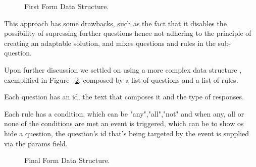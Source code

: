 \begin{figure}[H]
	\begin{center}
	\end{center}
	\caption{First Form Data Structure.}\label{fig:old_form}
\end{figure}

This approach has some drawbacks, such as the fact that it disables the possibility of supressing further questions hence not adhering to the principle of creating an adaptable solution, and mixes questions and rules in the sub-question.

Upon further discussion we settled on using a more complex data structure , exemplified in Figure ~\ref{fig:new_form}, composed by a list of questions and a list of rules.

Each question has an id, the text that composes it and the type of responses.

Each rule has a condition, which can be "any","all","not" and when any, all or none of the conditions are met an event is triggered, which can be to show os hide a question, the question's id that's being targeted by the event is supplied via the params field.


\begin{figure}[H]
	\begin{center}
	\end{center}
	\caption{Final Form Data Structure.}\label{fig:new_form}
\end{figure}


